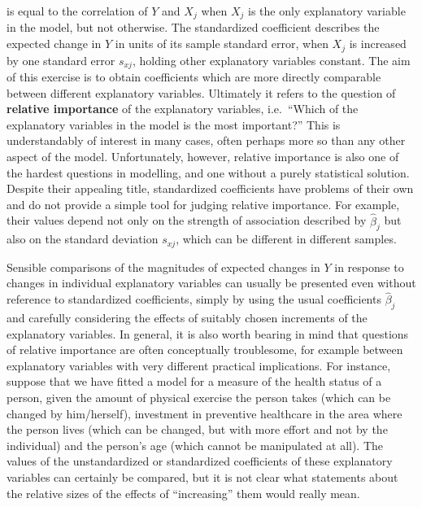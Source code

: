 \documentclass[11pt,a4paper,openany]{book}
\begin{document}
\begin{itemize}
  is equal to the correlation of \(Y\) and \(X_{j}\) when \(X_{j}\) is
  the only explanatory variable in the model, but not otherwise. The
  standardized coefficient describes the expected change in \(Y\) in
  units of its sample standard error, when \(X_{j}\) is increased by one
  standard error \(s_{xj}\), holding other explanatory variables
  constant. The aim of this exercise is to obtain coefficients which are
  more directly comparable between different explanatory variables.
  Ultimately it refers to the question of \textbf{relative importance}
  of the explanatory variables, i.e.~``Which of the explanatory
  variables in the model is the most important?'' This is understandably
  of interest in many cases, often perhaps more so than any other aspect
  of the model. Unfortunately, however, relative importance is also one
  of the hardest questions in modelling, and one without a purely
  statistical solution. Despite their appealing title, standardized
  coefficients have problems of their own and do not provide a simple
  tool for judging relative importance. For example, their values depend
  not only on the strength of association described by
  \(\hat{\beta}_{j}\) but also on the standard deviation \(s_{xj}\),
  which can be different in different samples.

  Sensible comparisons of the magnitudes of expected changes in \(Y\) in
  response to changes in individual explanatory variables can usually be
  presented even without reference to standardized coefficients, simply
  by using the usual coefficients \(\hat{\beta}_{j}\) and carefully
  considering the effects of suitably chosen increments of the
  explanatory variables. In general, it is also worth bearing in mind
  that questions of relative importance are often conceptually
  troublesome, for example between explanatory variables with very
  different practical implications. For instance, suppose that we have
  fitted a model for a measure of the health status of a person, given
  the amount of physical exercise the person takes (which can be changed
  by him/herself), investment in preventive healthcare in the area where
  the person lives (which can be changed, but with more effort and not
  by the individual) and the person's age (which cannot be manipulated
  at all). The values of the unstandardized or standardized coefficients
  of these explanatory variables can certainly be compared, but it is
  not clear what statements about the relative sizes of the effects of
  ``increasing'' them would really mean.
\end{itemize}
\end{document}
